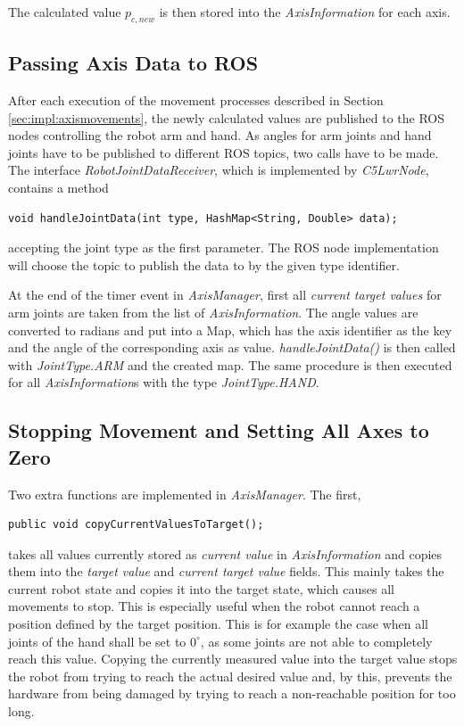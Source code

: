 The calculated value $p_{c,new}$ is then stored into the \textit{AxisInformation} for each axis.

\subsection{Passing Axis Data to ROS}
\label{sec:impl:aximgrros}

After each execution of the movement processes described in Section \ref{sec:impl:axismovements}, the newly calculated values are published to the ROS nodes controlling the robot arm and hand. As angles for arm joints and hand joints have to be published to different ROS topics, two calls have to be made. The interface \textit{RobotJointDataReceiver}, which is implemented by \textit{C5LwrNode}, contains a method
\begin{lstlisting}
void handleJointData(int type, HashMap<String, Double> data);
\end{lstlisting}
accepting the joint type as the first parameter. The ROS node implementation will choose the topic to publish the data to by the given type identifier.

At the end of the timer event in \textit{AxisManager}, first all \textit{current target values} for arm joints are taken from the list of \textit{AxisInformation}. The angle values are converted to radians and put into a Map, which has the axis identifier as the key and the angle of the corresponding axis as value. \textit{handleJointData()} is then called with \textit{JointType.ARM} and the created map. The same procedure is then executed for all \textit{AxisInformation}s with the type \textit{JointType.HAND}.

\subsection{Stopping Movement and Setting All Axes to Zero}
\label{sec:impl:axism:stop}
Two extra functions are implemented in \textit{AxisManager}. The first,
\begin{lstlisting}
public void copyCurrentValuesToTarget();
\end{lstlisting}
takes all values currently stored as \textit{current value} in \textit{AxisInformation} and copies them into the \textit{target value} and \textit{current target value} fields. This mainly takes the current robot state and copies it into the target state, which causes all movements to stop. This is especially useful when the robot cannot reach a position defined by the target position. This is for example the case when all joints of the hand shall be set to $0^\circ$, as some joints are not able to completely reach this value. Copying the currently measured value into the target value stops the robot from trying to reach the actual desired value and, by this, prevents the hardware from being damaged by trying to reach a non-reachable position for too long.

